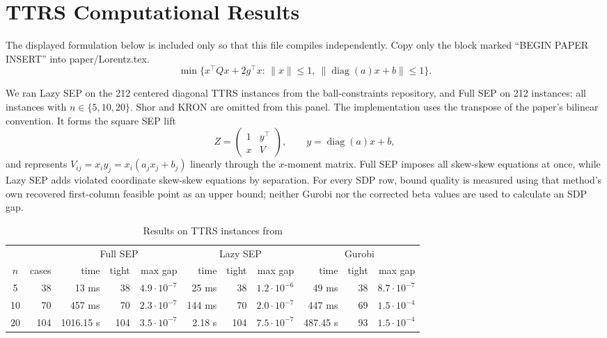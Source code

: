 \documentclass[11pt]{article}
\providecommand{\suchthat}{:\,}
\begin{document}
\section*{TTRS Computational Results}

The displayed formulation below is included only so that this file compiles
independently.  Copy only the block marked ``BEGIN PAPER INSERT'' into
paper/Lorentz.tex.
\begin{equation}
\min\{x^\top Qx+2g^\top x\suchthat \|x\|\le 1,\ \|\operatorname{diag}(a)x+b\|\le 1\}.
\end{equation}

\noindent We ran Lazy SEP on the 212 centered diagonal TTRS instances from
the ball-constraints repository, and Full SEP on 212 instances:
all instances with \(n\in\{5, 10, 20\}\).  Shor and KRON are omitted from this panel.  The implementation uses the
transpose of the paper's bilinear convention.  It forms the square SEP lift
\[
Z=\begin{pmatrix}1&y^\top\\ x&V\end{pmatrix},\qquad
y=\operatorname{diag}(a)x+b,
\]
and represents \(V_{ij}=x_i y_j=x_i(a_jx_j+b_j)\) linearly through the
\(x\)-moment matrix.  Full SEP imposes all skew-skew equations at once, while
Lazy SEP adds violated coordinate skew-skew equations by separation.  For every SDP row, bound quality is measured using that method's own recovered first-column feasible point as an upper bound; neither Gurobi nor the corrected beta values are used to calculate an SDP gap.

\begin{table}[htbp]
\centering
\caption{Results on TTRS instances from \cite{Burer.Anstreicher.2013}}
\label{tab:TTRS_results}
\vskip 10pt
\begingroup
\setlength{\tabcolsep}{3pt}
\small
\begin{tabular}{c r|r r r| r r r|r r r }
\hline
\multicolumn{2}{c|}{} & \multicolumn{3}{c|}{Full SEP} & \multicolumn{3}{c|}{Lazy SEP}& \multicolumn{3}{c}{Gurobi} \\
\(n\) & cases & time & tight & max gap & time & tight & max gap   & time&tight&max gap \\
\hline
5 & 38 & 13 ms & 38 & $4.9\cdot 10^{-7}$ & 25 ms & 38 & $1.2\cdot 10^{-6}$ & 49 ms & 38 & $8.7\cdot 10^{-7}$ \\
10 & 70 & 457 ms & 70 & $2.3\cdot 10^{-7}$ & 144 ms & 70 & $2.0\cdot 10^{-7}$ & 447 ms & 69 & $1.5\cdot 10^{-4}$ \\
20 & 104 & 1016.15 s & 104 & $3.5\cdot 10^{-7}$ & 2.18 s & 104 & $7.5\cdot 10^{-7}$ & 487.45 s & 93 & $1.5\cdot 10^{-4}$ \\
\hline
\hline
\end{tabular}
\endgroup
\end{table}
\end{document}
